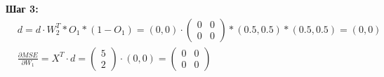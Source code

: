 \begin{sol}
\textbf{Шаг 3:}
\begin{equation*} 
	\begin{aligned}
		&  d = d \cdot W_2^T * O_1 * (1 - O_1) = (0, 0) \cdot  \begin{pmatrix} 0 & 0 \\ 0 & 0 \end{pmatrix} * (0.5, 0.5) * (0.5, 0.5) = (0, 0) \\
		&  \frac{\partial MSE}{\partial W_1} = X^T \cdot d = \begin{pmatrix} 5 \\ 2 \end{pmatrix} \cdot (0, 0) = \begin{pmatrix} 0 & 0 \\ 0 & 0 \end{pmatrix} \\
	\end{aligned}
\end{equation*}


\end{sol}

